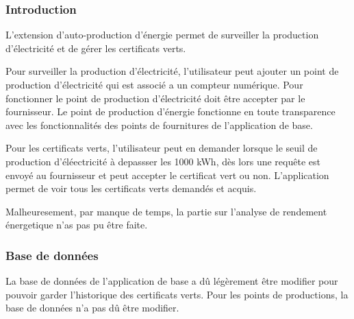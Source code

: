\documentclass[../rapport.tex]{subfiles}
\begin{document}
\subsubsection{Introduction}

L'extension d'auto-production d'énergie permet de surveiller la production d'électricité et de gérer les certificats verts.

\vspace{4mm}

Pour surveiller la production d'électricité, l'utilisateur peut ajouter un point de production d'électricité qui est associé a un compteur numérique. Pour fonctionner le point de production d'électricité doit être accepter par le fournisseur. Le point de production d'énergie fonctionne en toute transparence avec les fonctionnalités des points de fournitures de l'application de base.

\vspace{4mm}

Pour les certificats verts, l'utilisateur peut en demander lorsque le seuil de production d'éléectricité à depassser les 1000 kWh, dès lors une requête est envoyé au fournisseur et peut accepter le certificat vert ou non.
L'application permet de voir tous les certificats verts demandés et acquis.

\vspace{4mm}

Malheuresement, par manque de temps, la partie sur l'analyse de rendement énergetique n'as pas pu être faite.

\subsubsection{Base de données}

La base de données de l'application de base a dû légèrement être modifier pour pouvoir garder l'historique des certificats verts.
Pour les points de productions, la base de données n'a pas dû être modifier.
\end{document}
